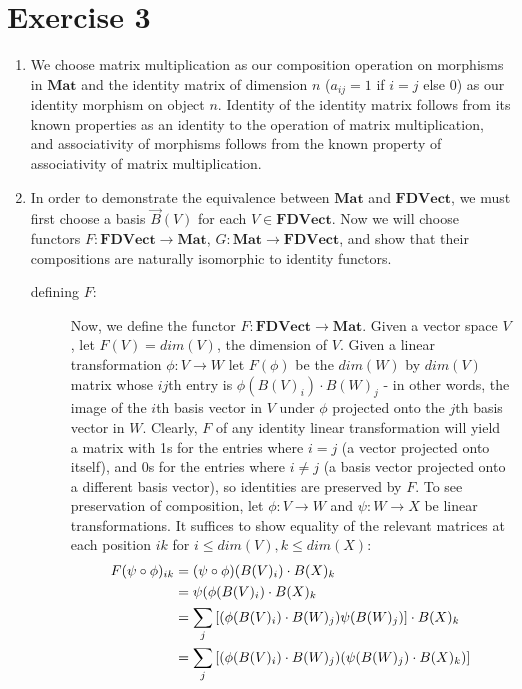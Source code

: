 \documentclass{article}
\begin{document}
\section*{Exercise 3}
\newcommand{\Mat}{\mathbf{Mat}}
\newcommand{\FDV}{\mathbf{FDVect}}
\renewcommand{\dim}{\mathit{dim}}
\begin{enumerate}
\item We choose matrix multiplication as our composition operation on morphisms in $\Mat$ and the identity matrix of dimension $n$ ($a_{ij} = 1$ if $i = j$ else 0) as our identity morphism on object $n$. Identity of the identity matrix follows from its known properties as an identity to the operation of matrix multiplication, and associativity of morphisms follows from the known property of associativity of matrix multiplication.
\item In order to demonstrate the equivalence between $\Mat$ and $\FDV$, we must first choose a basis $\vec{B}(V)$ for each $V \in \FDV$. Now we will choose functors $F: \FDV \to \Mat$, $G: \Mat \to \FDV$, and show that their compositions are naturally isomorphic to identity functors.
  \begin{description}
  \item[defining $F$:] 
  Now, we define the functor $F: \FDV \to \Mat$. Given a vector space $V$, let $F(V) = \dim(V)$, the dimension of $V$. Given a linear transformation $\phi: V \to W$ let $F(\phi)$ be the $\dim(W)$ by $\dim(V)$ matrix whose $ij$th entry is $\phi(B(V)_i) \cdot B(W)_j$ - in other words, the image of the $i$th basis vector in $V$ under $\phi$ projected onto the $j$th basis vector in $W$. Clearly, $F$ of any identity linear transformation will yield a matrix with 1s for the entries where $i = j$ (a vector projected onto itself), and 0s for the entries where $i \ne j$ (a basis vector projected onto a different basis vector), so identities are preserved by $F$. To see preservation of composition, let $\phi: V \to W$ and $\psi: W \to X$ be linear transformations. It suffices to show equality of the relevant matrices at each position $ik$ for $i \le \dim(V), k \le \dim(X)$:
  \begin{align}
    F(\psi \circ \phi)_{ik} &= (\psi \circ \phi)(B(V)_i) \cdot B(X)_k \\
                            &= \psi(\phi(B(V)_i) \cdot B(X)_k \\
                            &= \sum_j\qty[\qty(\phi(B(V)_i)\cdot B(W)_j)\psi(B(W)_j)] \cdot B(X)_k \label{a} \\
                            &= \sum_j\qty[\qty(\phi(B(V)_i) \cdot B(W)_j) \qty(\psi(B(W)_j) \cdot B(X)_k)] \\

\end{align}
\end{description}
\end{enumerate}
\end{document}
